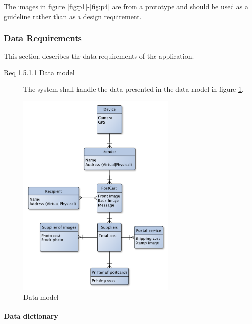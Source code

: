 \documentclass[10pt,a4paper]{article}
\begin{document}
	The images in figure \ref{fig:p1}-\ref{fig:p4} are from a  prototype and should be used as a guideline rather than as a design requirement.

\subsubsection{Data Requirements}
This section describes the data requirements of the application.

\begin {description}
\item[Req 1.5.1.1 Data model] The system shall handle the data presented in the data model in figure \ref{fig:datamodel}.
\end{description}

\begin{figure}[h!]
\centering
\includegraphics[width=0.7\textwidth]{Data_figures/DataModel.pdf}
\caption{Data model}
\label{fig:datamodel}
\end{figure}
\FloatBarrier
\paragraph{Data dictionary}
\end{document}
